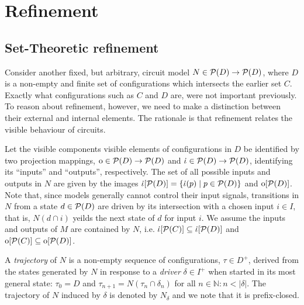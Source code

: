 \section{Refinement}

\subsection{Set-Theoretic refinement}

Consider another fixed, but arbitrary, circuit model $N \in \mathcal{P}(D) \rightarrow \mathcal{P}(D)$, where $D$ is a non-empty and finite set of configurations which intersects the earlier set $C$. Exactly what configurations such as $C$ and $D$ are, were not important previously. To reason about refinement, however, we need to make a distinction between their external and internal elements. The rationale is that refinement relates the visible behaviour of circuits. 


Let the visible components visible elements of configurations in $D$ be identified by two projection mappings, $\operatorname{\mathrm{o}} \in \mathcal{P}(D) \rightarrow \mathcal{P}(D)$ and $\operatorname{\dot{\iota}} \in \mathcal{P}(D) \rightarrow \mathcal{P}(D)$, identifying its ``inputs'' and ``outputs'', respectively. The set of all possible inputs and outputs in $N$ are given by the images $\operatorname{\dot{\iota}}[\mathcal{P}(D)] = \{ \operatorname{\dot{\iota}}(p) \mid p \in \mathcal{P}(D) \}$ and $\operatorname{\mathrm{o}}[\mathcal{P}(D)]$. Note that, since models generally cannot control their input signals, transitions in $N$ from a state $d \in \mathcal{P}(D)$ are driven by its intersection with a chosen input $i \in I$, that is, $N(d \cap i)$ yeilds the next state of $d$ for input $i$. We assume the inputs and outputs of $M$ are contained by $N$, i.e. $\operatorname{\dot{\iota}}[\mathcal{P}(C)] \subseteq \operatorname{\dot{\iota}}[\mathcal{P}(D)]$ and $\operatorname{\mathrm{o}}[\mathcal{P}(C)] \subseteq \operatorname{\mathrm{o}}[\mathcal{P}(D)]$.

A \textit{trajectory} of $N$ is a non-empty sequence of configurations, $\tau \in D^{+}$, derived from the states generated by $N$ in response to a \textit{driver} $\delta \in I^{+}$ when started in its most general state: $\tau_{0} = D$ and $\tau_{n+1} = N(\tau_{n} \cap \delta_{n})$ for all $n \in \mathbb{N} : n < | \delta |$. The trajectory of $N$ induced by $\delta$ is denoted by $N_{\delta}$ and we note that it is prefix-closed. 

